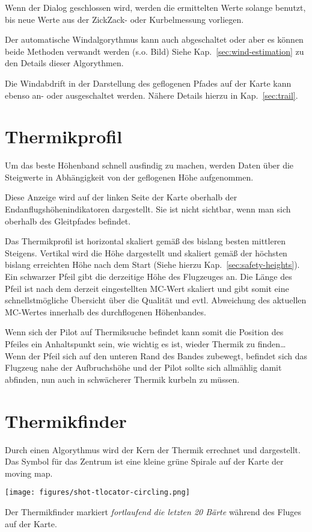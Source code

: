 Wenn der Dialog geschlossen wird, werden die ermittelten Werte solange benutzt,
 bis neue Werte aus der ZickZack- oder Kurbelmessung vorliegen.

Der automatische Windalgorythmus kann auch abgeschaltet oder aber es können
beide Methoden verwandt werden (s.o. Bild) Siehe Kap.~\ref{sec:wind-estimation}
zu den Details dieser Algorythmen.

Die Windabdrift in der Darstellung des geflogenen Pfades  auf der Karte kann ebenso an-
oder ausgeschaltet werden. Nähere Details hierzu in Kap.~\ref{sec:trail}.
\section{Thermikprofil}
Um das beste Höhenband schnell ausfindig zu machen, werden Daten über die Steigwerte in
Abhängigkeit von der geflogenen Höhe aufgenommen.

Diese Anzeige wird auf der linken Seite der Karte oberhalb der Endanflugshöhenindikatoren dargestellt.
Sie ist nicht sichtbar, wenn man sich oberhalb des Gleitpfades befindet. 

Das Thermikprofil ist horizontal skaliert gemäß des bislang besten mittleren Steigens.
Vertikal wird die Höhe dargestellt und skaliert gemäß der höchsten bislang erreichten Höhe nach dem Start
(Siehe hierzu Kap.~\ref{sec:safety-heights}). Ein schwarzer Pfeil gibt die derzeitige Höhe des Flugzeuges an.
Die Länge des  Pfeil ist nach dem derzeit eingestellten MC-Wert skaliert und gibt somit eine schnellstmögliche Übersicht über die Qualität und evtl. Abweichung des aktuellen MC-Wertes innerhalb des durchflogenen Höhenbandes.

Wenn sich der Pilot auf Thermiksuche befindet kann somit die Position des Pfeiles ein Anhaltspunkt sein,
wie wichtig es ist, wieder Thermik zu finden\dots
Wenn der Pfeil sich auf den unteren Rand des Bandes zubewegt, befindet sich das Flugzeug nahe der Aufbruchshöhe und der Pilot sollte sich allmählig damit abfinden, nun auch in schwächerer Thermik kurbeln zu müssen.
\section{Thermikfinder}
Durch einen Algorythmus wird der Kern der Thermik errechnet und dargestellt.
Das Symbol für das Zentrum ist eine kleine grüne Spirale auf der Karte der moving map.
\begin{center}
\texttt{[image: figures/shot-tlocator-circling.png]}
\end{center}
Der Thermikfinder markiert \textit{fortlaufend  die letzten 20 Bärte} während des Fluges auf der Karte.

